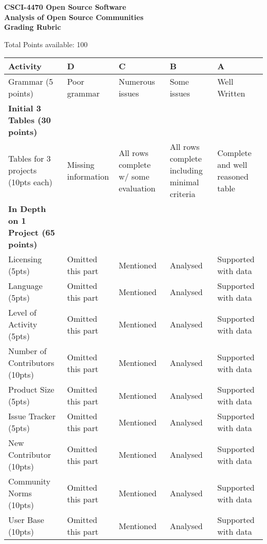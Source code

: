 \documentclass[11pt]{article}
\begin{document}
\begin{center}
\Large
\textbf{CSCI-4470 Open Source Software \\
Analysis of Open Source Communities \\
Grading Rubric}
\end{center}

Total Points available: 100 \\
\begin{tabularx}{\linewidth}{|l|X|X|X|X|}
	\hline
	Activity & D & C & B & A \\ \hline
	Grammar (5 points) & Poor grammar & Numerous issues & Some issues & Well Written \\ \hline
	\textbf{Initial 3 Tables (30 points)} & & & & \\ \hline
	Tables for 3 projects (10pts each) & Missing information & All rows complete w/ some evaluation & All rows complete including minimal criteria & Complete and well reasoned table \\ \hline
    \textbf{In Depth on 1 Project (65 points)}  & & & & \\ \hline
	Licensing (5pts) & Omitted this part & Mentioned & Analysed &Supported with data \\ \hline
	Language (5pts) & Omitted this part & Mentioned & Analysed &Supported with data \\ \hline
	Level of Activity (5pts) & Omitted this part & Mentioned & Analysed &Supported with data \\ \hline
	Number of Contributors (10pts) & Omitted this part & Mentioned & Analysed &Supported with data \\ \hline
	Product Size (5pts) & Omitted this part & Mentioned & Analysed &Supported with data \\ \hline
	Issue Tracker (5pts) & Omitted this part & Mentioned & Analysed &Supported with data \\ \hline
	New Contributor (10pts) & Omitted this part & Mentioned & Analysed &Supported with data \\ \hline
	Community Norms (10pts) & Omitted this part & Mentioned & Analysed &Supported with data \\ \hline
	User Base (10pts) & Omitted this part & Mentioned & Analysed &Supported with data \\ \hline
\end{tabularx}
\end{document}
